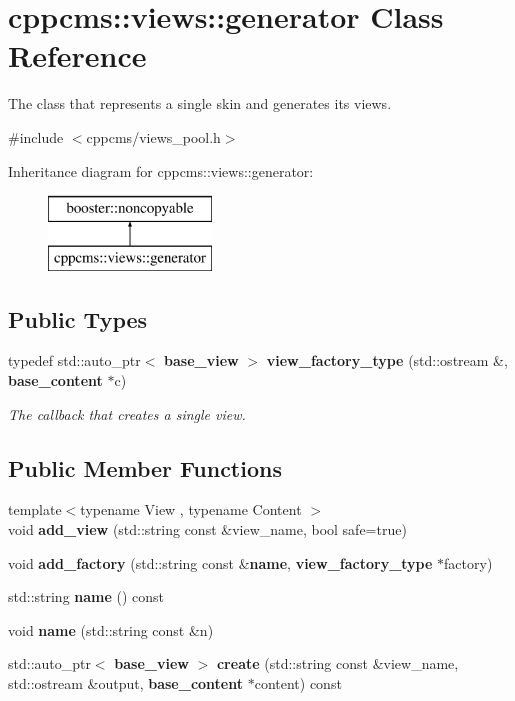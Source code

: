 \section{cppcms\-:\-:views\-:\-:generator Class Reference}
\label{classcppcms_1_1views_1_1generator}


The class that represents a single skin and generates its views.  




{\ttfamily \#include $<$cppcms/views\-\_\-pool.\-h$>$}

Inheritance diagram for cppcms\-:\-:views\-:\-:generator\-:\begin{figure}[H]
\begin{center}
\leavevmode
\includegraphics[height=2.000000cm]{classcppcms_1_1views_1_1generator}
\end{center}
\end{figure}
\subsection*{Public Types}
\begin{DoxyCompactItemize}
\item 
typedef std\-::auto\-\_\-ptr$<$ {\bf base\-\_\-view} $>$ {\bf view\-\_\-factory\-\_\-type} (std\-::ostream \&, {\bf base\-\_\-content} $\ast$c)\label{classcppcms_1_1views_1_1generator_af51d091d42138b8c06fbc2cba5d71c83}

\begin{DoxyCompactList}\small\item\em The callback that creates a single view. \end{DoxyCompactList}\end{DoxyCompactItemize}
\subsection*{Public Member Functions}
\begin{DoxyCompactItemize}
\item 
{\footnotesize template$<$typename View , typename Content $>$ }\\void {\bf add\-\_\-view} (std\-::string const \&view\-\_\-name, bool safe=true)
\item 
void {\bf add\-\_\-factory} (std\-::string const \&{\bf name}, {\bf view\-\_\-factory\-\_\-type} $\ast$factory)
\item 
std\-::string {\bf name} () const 
\item 
void {\bf name} (std\-::string const \&n)
\item 
std\-::auto\-\_\-ptr$<$ {\bf base\-\_\-view} $>$ {\bf create} (std\-::string const \&view\-\_\-name, std\-::ostream \&output, {\bf base\-\_\-content} $\ast$content) const 
\end{DoxyCompactItemize}


